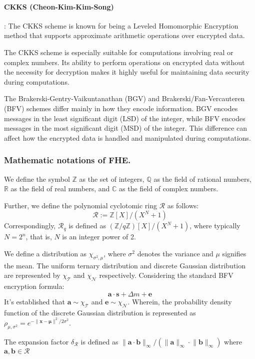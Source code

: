 \documentclass[11pt]{article}
\begin{document}
\paragraph{CKKS (Cheon-Kim-Kim-Song)}: The CKKS scheme is known for being a Leveled Homomorphic Encryption method that supports approximate arithmetic operations over encrypted data.

The CKKS scheme is especially suitable for computations involving real or complex numbers.
Its ability to perform operations on encrypted data without the necessity for decryption makes it highly useful for maintaining data security during computations.

The Brakerski-Gentry-Vaikuntanathan (BGV) and Brakerski/Fan-Vercauteren (BFV) schemes differ mainly in how they encode information.
BGV encodes messages in the least significant digit (LSD) of the integer, while BFV encodes messages in the most significant digit (MSD) of the integer.
This difference can affect how the encrypted data is handled and manipulated during computations.

\subsubsection{Mathematic notations of FHE.}
We define the symbol $\mathbb{Z}$ as the set of integers, $\mathbb{Q}$ as the field of rational numbers, $\mathbb{R}$ as the field of real numbers, and $\mathbb{C}$ as the field of complex numbers.

Further, we define the polynomial cyclotomic ring $\mathcal{R}$ as follows: $$\mathcal{R}:=\mathbb{Z}[X]/(X^N+1)$$ Correspondingly, $\mathcal{R}_q$ is defined as $(\mathbb{Z}/q\mathbb{Z})[X]/(X^N+1)$, where typically $N=2^n$, that is, $N$ is an integer power of 2.

We define a distribution as $\chi_{\sigma^2,\mu}$, where $\sigma^2$ denotes the variance and $\mu$ signifies the mean. The uniform ternary distribution and discrete Gaussian distribution are represented by $\chi_\mathcal{T}$ and $\chi_\mathcal{N}$ respectively. Considering the standard BFV encryption formula: $$\mathbf{a}\cdot \mathbf{s} +\Delta m +\mathbf{e}$$
It's established that $\mathbf{a}\sim\chi_\mathcal{T}$ and $\mathbf{e}\sim\chi_{\mathcal{N}}$.
Wherein, the probability density function of the discrete Gaussian distribution is represented as $\rho_{\mu,\sigma^2}=e^{-\lVert\mathbf{x}-\mathbf{\mu}\rVert^2/2\sigma^2}$.

The expansion factor $\delta_\mathcal{R}$ is defined as $\lVert \mathbf{a}\cdot\mathbf{b}\rVert_\infty/(\lVert\mathbf{a}\rVert_\infty\cdot\lVert\mathbf{b}\rVert_\infty)$ where $\mathbf{a},\mathbf{b}\in \mathcal{R}$
\end{document}
